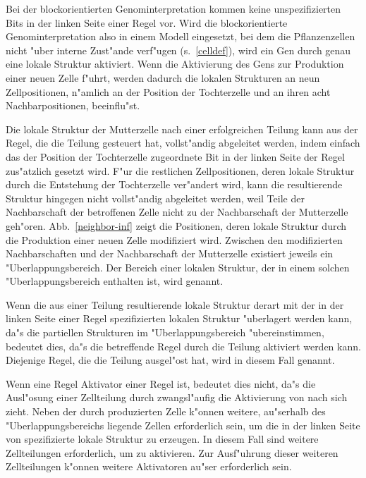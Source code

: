 Bei der blockorientierten Genominterpretation kommen keine unspezifizierten Bits
in der linken Seite einer Regel vor. 
Wird die blockorientierte Genominterpretation also in einem Modell eingesetzt,
bei dem die Pflanzenzellen nicht "uber interne Zust"ande verf"ugen (s.\ \ref{celldef}),
wird ein Gen durch genau eine lokale Struktur
aktiviert. Wenn die Aktivierung des Gens zur Produktion einer neuen Zelle f"uhrt,
werden dadurch die lokalen Strukturen an neun Zellpositionen, n"amlich an
der Position der Tochterzelle und an ihren acht Nachbarpositionen, beeinflu"st.

Die lokale Struktur der Mutterzelle nach einer erfolgreichen Teilung kann aus
der Regel, die die Teilung gesteuert hat, vollst"andig abgeleitet werden, indem
einfach das der Position der Tochterzelle zugeordnete Bit in der linken Seite
der Regel zus"atzlich gesetzt wird. F"ur die restlichen Zellpositionen, deren
lokale Struktur durch die Entstehung der Tochterzelle ver"andert wird, kann die
resultierende Struktur hingegen nicht vollst"andig abgeleitet werden, weil
Teile der Nachbarschaft der betroffenen Zelle nicht zu der Nachbarschaft der
Mutterzelle geh"oren. Abb.\ \ref{neighbor-inf} zeigt die Positionen, 
deren lokale Struktur durch die Produktion einer neuen Zelle modifiziert wird.
Zwischen den modifizierten Nachbarschaften und der Nachbarschaft der Mutterzelle
existiert jeweils ein "Uberlappungsbereich. Der Bereich einer lokalen Struktur, der in einem
solchen "Uberlappungsbereich enthalten ist, wird 
genannt.

Wenn die aus einer Teilung resultierende lokale Struktur derart mit der in der
linken Seite einer Regel spezifizierten lokalen Struktur "uberlagert werden
kann, da"s die partiellen Strukturen im "Uberlappungsbereich "ubereinstimmen,
bedeutet dies, da"s die betreffende Regel durch die Teilung aktiviert werden
kann. Diejenige Regel, die die Teilung ausgel"ost hat, wird in diesem Fall
 genannt.

Wenn eine Regel  Aktivator einer Regel  ist, bedeutet dies
nicht, da"s die Ausl"osung einer Zellteilung durch  zwangsl"aufig
die Aktivierung von  nach sich zieht. Neben der durch 
produzierten Zelle k"onnen weitere, au"serhalb des "Uberlappungsbereichs liegende
Zellen erforderlich sein, um die in der
linken Seite von  spezifizierte lokale Struktur zu erzeugen.
In diesem Fall sind weitere Zellteilungen erforderlich,
um  zu aktivieren. Zur Ausf"uhrung dieser weiteren Zellteilungen k"onnen
weitere Aktivatoren au"ser  erforderlich sein.

